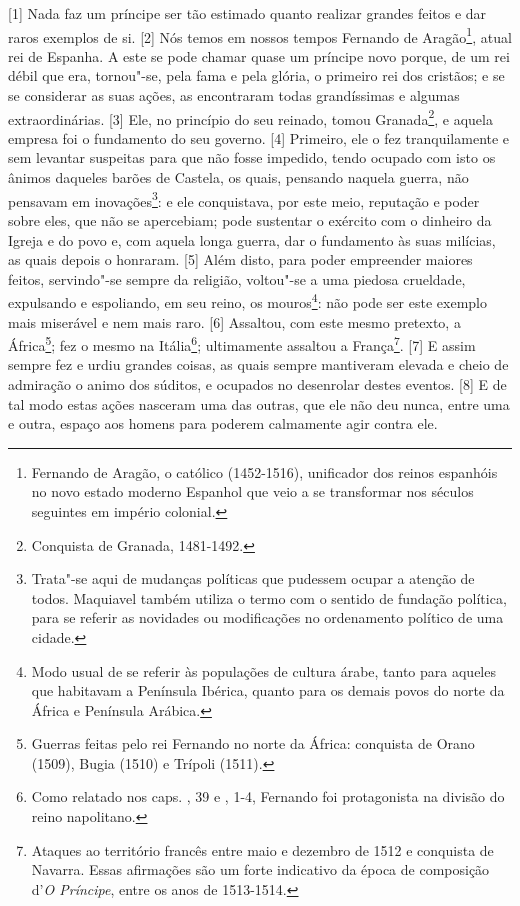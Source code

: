 {[}1{]} Nada faz um príncipe ser tão estimado quanto realizar grandes
feitos e dar raros exemplos de si. {[}2{]} Nós temos em nossos tempos
Fernando de Aragão\footnote{Fernando de Aragão, o católico (1452-1516),
  unificador dos reinos espanhóis no novo estado moderno Espanhol que
  veio a se transformar nos séculos seguintes em império colonial.},
atual rei de Espanha. A este se pode chamar quase um príncipe novo
porque, de um rei débil que era, tornou"-se, pela fama e pela glória, o
primeiro rei dos cristãos; e se se considerar as suas ações, as
encontraram todas grandíssimas e algumas extraordinárias. {[}3{]} Ele,
no princípio do seu reinado, tomou Granada\footnote{Conquista de
  Granada, 1481-1492.}, e aquela empresa foi o fundamento do seu
governo. {[}4{]} Primeiro, ele o fez tranquilamente e sem levantar
suspeitas para que não fosse impedido, tendo ocupado com isto os ânimos
daqueles barões de Castela, os quais, pensando naquela guerra, não
pensavam em inovações\footnote{Trata"-se aqui de mudanças políticas que
  pudessem ocupar a atenção de todos. Maquiavel também utiliza o termo
  com o sentido de fundação política, para se referir as novidades ou
  modificações no
  ordenamento político de uma cidade.}: e ele conquistava, por este
meio, reputação e poder sobre eles, que não se apercebiam; pode
sustentar o exército com o dinheiro da Igreja e do povo e, com aquela
longa guerra, dar o fundamento às suas milícias, as quais depois o
honraram. {[}5{]} Além disto, para poder empreender maiores feitos,
servindo"-se sempre da religião, voltou"-se a uma piedosa crueldade,
expulsando e espoliando, em seu reino, os mouros\footnote{Modo usual de
  se referir às populações de cultura árabe, tanto para aqueles que
  habitavam a Península Ibérica, quanto para os demais povos do norte da
  África e Península Arábica.}: não pode ser este exemplo mais miserável
e nem mais raro. {[}6{]} Assaltou, com este mesmo pretexto, a
África\footnote{Guerras feitas pelo rei Fernando no norte da África:
  conquista de Orano (1509), Bugia (1510) e Trípoli (1511).}; fez o
mesmo na Itália\footnote{Como relatado nos caps. , 39 e , 1-4,
  Fernando foi protagonista na divisão do reino napolitano.};
ultimamente assaltou a França\footnote{Ataques ao território francês
  entre maio e dezembro de 1512 e conquista de Navarra. Essas afirmações
  são um forte indicativo da época de composição d'\emph{O Príncipe},
  entre os anos de 1513-1514.}. {[}7{]} E assim sempre fez e urdiu
grandes coisas, as quais sempre mantiveram elevada e cheio de admiração
o animo dos súditos, e ocupados no desenrolar destes eventos. {[}8{]} E
de tal modo estas ações nasceram uma das outras, que ele não deu nunca,
entre uma e outra, espaço aos homens para poderem calmamente agir contra
ele.

